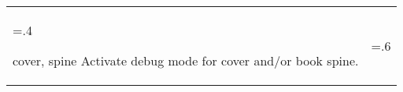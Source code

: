 \begin{xltabular}{\linewidth}{>{\hsize=.4\hsize\raggedright\arraybackslash}X>{\hsize=.6\hsize}X}
    \midrule
    {cover, spine}%
    {Activate debug mode for cover and/or book spine.}%
	{%
    }
%
%
%
%

\end{xltabular}
